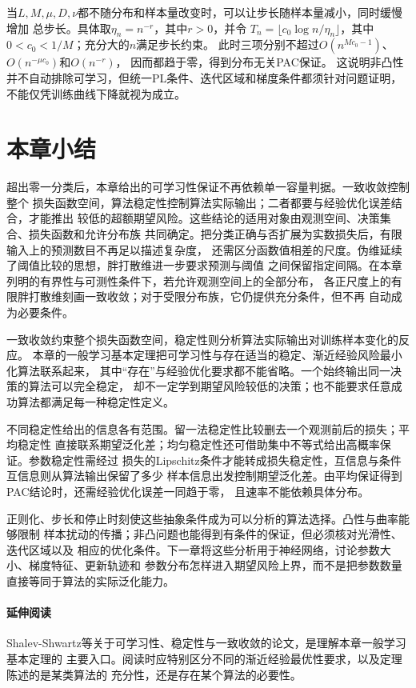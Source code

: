当$L,M,\mu,D,\nu$都不随分布和样本量改变时，可以让步长随样本量减小，同时缓慢增加
总步长。具体取$\eta_n=n^{-r}$，其中$r>0$，并令
$T_n=\lfloor c_0\log n/\eta_n\rfloor$，其中$0<c_0<1/M$；充分大的$n$满足步长约束。
此时三项分别不超过$O(n^{Mc_0-1})$、$O(n^{-\mu c_0})$和$O(n^{-r})$，
因而都趋于零，得到分布无关PAC保证。
这说明非凸性并不自动排除可学习，但统一PL条件、迭代区域和梯度条件都须针对问题证明，
不能仅凭训练曲线下降就视为成立。

\section{本章小结}
\label{sec:general-learning-summary}

超出零一分类后，本章给出的可学习性保证不再依赖单一容量判据。一致收敛控制整个
损失函数空间，算法稳定性控制算法实际输出；二者都要与经验优化误差结合，才能推出
较低的超额期望风险。这些结论的适用对象由观测空间、决策集合、损失函数和允许分布族
共同确定。把分类正确与否扩展为实数损失后，有限输入上的预测数目不再足以描述复杂度，
还需区分函数值相差的尺度。伪维延续了阈值比较的思想，胖打散维进一步要求预测与阈值
之间保留指定间隔。在本章列明的有界性与可测性条件下，若允许观测空间上的全部分布，
各正尺度上的有限胖打散维刻画一致收敛；对于受限分布族，它仍提供充分条件，但不再
自动成为必要条件。

一致收敛约束整个损失函数空间，稳定性则分析算法实际输出对训练样本变化的反应。
本章的一般学习基本定理把可学习性与存在适当的稳定、渐近经验风险最小化算法联系起来，
其中“存在”与经验优化要求都不能省略。一个始终输出同一决策的算法可以完全稳定，
却不一定学到期望风险较低的决策；也不能要求任意成功算法都满足每一种稳定性定义。

不同稳定性给出的信息各有范围。留一法稳定性比较删去一个观测前后的损失；平均稳定性
直接联系期望泛化差；均匀稳定性还可借助集中不等式给出高概率保证。参数稳定性需经过
损失的Lipschitz条件才能转成损失稳定性，互信息与条件互信息则从算法输出保留了多少
样本信息出发控制期望泛化差。由平均保证得到PAC结论时，还需经验优化误差一同趋于零，
且速率不能依赖具体分布。

正则化、步长和停止时刻使这些抽象条件成为可以分析的算法选择。凸性与曲率能够限制
样本扰动的传播；非凸问题也能得到有条件的保证，但必须核对光滑性、迭代区域以及
相应的优化条件。下一章将这些分析用于神经网络，讨论参数大小、梯度特征、更新轨迹和
参数分布怎样进入期望风险上界，而不是把参数数量直接等同于算法的实际泛化能力。

\paragraph{延伸阅读}
Shalev-Shwartz等关于可学习性、稳定性与一致收敛的论文，是理解本章一般学习基本定理的
主要入口。阅读时应特别区分不同的渐近经验最优性要求，以及定理陈述的是某类算法的
充分性，还是存在某个算法的必要性。

